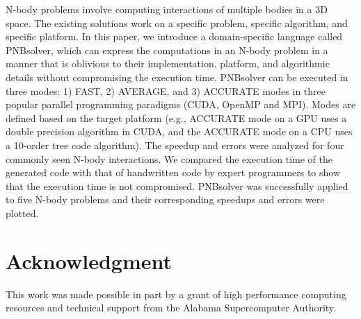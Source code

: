 \documentclass[draftclsnofoot]{elsarticle}
\begin{document}
N-body problems involve computing interactions of multiple bodies in a 3D space. The existing solutions work on a specific problem, specific algorithm, and specific platform. 
In this paper, we introduce a domain-specific language called PNBsolver, which can express the computations in an N-body problem in a manner that is oblivious to their implementation, 
platform, and algorithmic details without compromising the execution time. PNBsolver can be executed in three modes: 1) FAST, 2) AVERAGE, and 3) ACCURATE modes in three popular 
parallel programming paradigms (CUDA, OpenMP and MPI). Modes are defined based on the target platform (e.g., ACCURATE mode on a GPU uses a double precision algorithm in CUDA, 
and the ACCURATE mode on a CPU uses a 10-order tree code algorithm). The speedup and errors were analyzed for four commonly seen N-body interactions. We compared
the execution time of the generated code with that of handwritten code by expert programmers to show that the execution time is not compromised. PNBsolver was successfully 
applied to five N-body problems and their corresponding speedups and errors were plotted.






\section*{Acknowledgment}
This work was made possible in part by a grant of high performance computing resources and technical support from the Alabama Supercomputer Authority.







%
\end{document}
